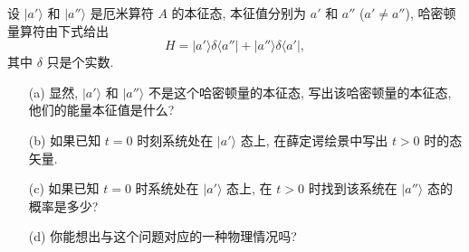 \documentclass{assignment}
\begin{document}
\begin{prob}[课本习题 2.9]
    设 $\lvert a'\rangle$ 和 $\lvert a''\rangle$ 是厄米算符 $A$ 的本征态, 本征值分别为 $a'$ 和 $a''$ ($a'\neq a''$), 哈密顿量算符由下式给出
    \[
        H=\lvert a'\rangle\delta\langle a''\rvert+\lvert a''\rangle\delta\langle a'\rvert,
    \]
    其中 $\delta$ 只是个实数.
    \begin{itemize}
        \item[(a)] 显然, $\lvert a'\rangle$ 和 $\lvert a''\rangle$ 不是这个哈密顿量的本征态, 写出该哈密顿量的本征态, 他们的能量本征值是什么?
        \item[(b)] 如果已知 $t=0$ 时刻系统处在 $\lvert a'\rangle$ 态上, 在薛定谔绘景中写出 $t>0$ 时的态矢量.
        \item[(c)] 如果已知 $t=0$ 时系统处在 $\lvert a'\rangle$ 态上, 在 $t>0$ 时找到该系统在 $\lvert a''\rangle$ 态的概率是多少?
        \item[(d)] 你能想出与这个问题对应的一种物理情况吗?
    \end{itemize}
\end{prob}
\end{document}

